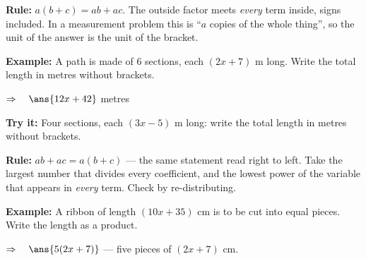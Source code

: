 \documentclass[12pt]{article}
\begin{document}


\begin{formulabox}
\textbf{Rule:} $a(b + c) = ab + ac$. The outside factor meets \emph{every} term inside, signs
included. In a measurement problem this is ``$a$ copies of the whole thing'', so the unit of the
answer is the unit of the bracket.
\end{formulabox}

\begin{examplebox}
\textbf{Example:} \quad A path is made of $6$ sections, each $(2x + 7)$ m long. Write the total
length in metres without brackets.

$\Rightarrow\quad \ans{12x + 42}$ metres
\end{examplebox}

\begin{tryitbox}
\textbf{Try it:} \quad Four sections, each $(3x - 5)$ m long: write the total length in metres
without brackets.\\[2pt]
\end{tryitbox}


\begin{formulabox}
\textbf{Rule:} $ab + ac = a(b + c)$ --- the same statement read right to left. Take the largest
number that divides every coefficient, and the lowest power of the variable that appears in
\emph{every} term. Check by re-distributing.
\end{formulabox}

\begin{examplebox}
\textbf{Example:} \quad A ribbon of length $(10x + 35)$ cm is to be cut into equal pieces. Write
the length as a product.

$\Rightarrow\quad \ans{5(2x + 7)}$ --- five pieces of $(2x + 7)$ cm.
\end{examplebox}
\end{document}
